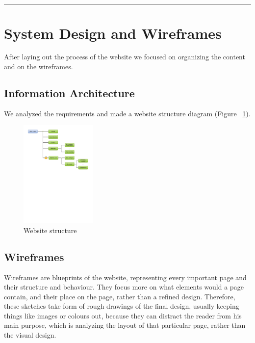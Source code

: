 \documentclass{l3proj}
\begin{document}
\newpage



\rule{430pt}{1pt}


\section{System Design and Wireframes}
After laying out the process of the website we focused on organizing the content
and on the wireframes.

\subsection{Information Architecture}
We analyzed the requirements and made a website structure diagram
(Figure ~\ref{website-structure}).

\begin{figure}[h]
\centering
\includegraphics[height=200px, trim=0px 450px 0px 100px]{website-structure}
\caption{Website structure}
\label{website-structure}
\end{figure}

\newpage
\subsection{Wireframes}
% 
% 
Wireframes are blueprints of the website, representing every important page and 
their structure and behaviour.
They focus more on what elements would a page contain, and their place on
the page, rather than a refined design. Therefore, these sketches take form of
rough drawings of the final design, usually keeping things like images or
colours out, because they can distract the reader from his main purpose, which
is analyzing the layout of that particular page, rather than the visual design.
\end{document}

